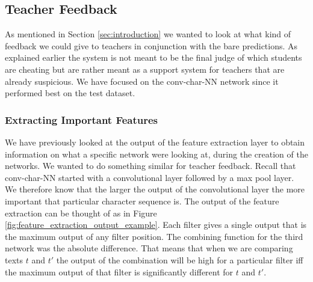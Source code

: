 \subsection{Teacher Feedback}\label{subsec:teacher_feedback_text_comparisons}

As mentioned in Section \ref{sec:introduction} we wanted to look at what kind
of feedback we could give to teachers in conjunction with the bare predictions.
As explained earlier the system is not meant to be the final judge of which
students are cheating but are rather meant as a support system for teachers that
are already suspicious. We have focused on the \gls{conv-char-NN} network since
it performed best on the test dataset.


\subsubsection{Extracting Important Features}

We have previously looked at the output of the feature extraction layer to
obtain information on what a specific network were looking at, during the
creation of the networks. We wanted to do something similar for teacher
feedback. Recall that \gls{conv-char-NN} started with a convolutional layer
followed by a max pool layer. We therefore know that the larger the output of
the convolutional layer the more important that particular character sequence
is. The output of the feature extraction can be thought of as in Figure
\ref{fig:feature_extraction_output_example}. Each filter gives a single output
that is the maximum output of any filter position. The combining function for
the third network was the absolute difference. That means that when we are
comparing texts $t$ and $t'$ the output of the combination will be high for
a particular filter iff the maximum output of that filter is significantly
different for $t$ and $t'$.

